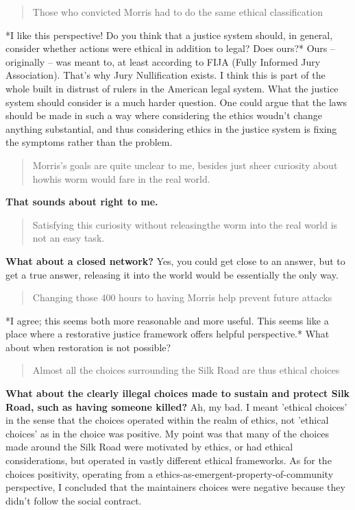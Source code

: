 \documentclass[letterpaper]{article}
\begin{document}
\begin{enumerate}
\begin{quote}
Those who convicted Morris had to do the same ethical classification
\end{quote}

*I like this perspective! Do you think that a justice system should, in
general, consider whether actions were ethical in addition to legal?
Does ours?* Ours -- originally -- was meant to, at least according to
FIJA (Fully Informed Jury Association). That's why Jury Nullification
exists. I think this is part of the whole built in distrust of rulers in
the American legal system. What the justice system should consider is a
much harder question. One could argue that the laws should be made in
such a way where considering the ethics woudn't change anything
substantial, and thus considering ethics in the justice system is fixing
the symptoms rather than the problem.

\begin{quote}
Morris's goals are quite unclear to me, besides just sheer curiosity
about howhis worm would fare in the real world.
\end{quote}

\textbf{That sounds about right to me.}

\begin{quote}
Satisfying this curiosity without releasingthe worm into the real
world is not an easy task.
\end{quote}

\textbf{What about a closed network?} Yes, you could get close to an answer,
but to get a true answer, releasing it into the world would be
essentially the only way.

\begin{quote}
Changing those 400 hours to having Morris help prevent future attacks
\end{quote}

*I agree; this seems both more reasonable and more useful. This seems
like a place where a restorative justice framework offers helpful
perspective.* What about when restoration is not possible?

\begin{quote}
Almost all the choices surrounding the Silk Road are thus ethical
choices
\end{quote}

\textbf{What about the clearly illegal choices made to sustain and protect Silk
Road, such as having someone killed?} Ah, my bad. I meant 'ethical
choices' in the sense that the choices operated within the realm of
ethics, not 'ethical choices' as in the choice was positive. My point
was that many of the choices made around the Silk Road were motivated by
ethics, or had ethical considerations, but operated in vastly different
ethical frameworks. As for the choices positivity, operating from a
ethics-as-emergent-property-of-community perspective, I concluded that
the maintainers choices were negative because they didn't follow the
social contract.


\end{enumerate}
\end{document}
